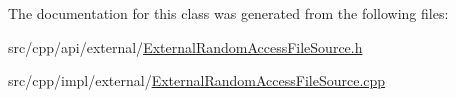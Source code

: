 The documentation for this class was generated from the following files:\begin{DoxyCompactItemize}
\item 
src/cpp/api/external/\hyperlink{ExternalRandomAccessFileSource_8h}{ExternalRandomAccessFileSource.h}\item 
src/cpp/impl/external/\hyperlink{ExternalRandomAccessFileSource_8cpp}{ExternalRandomAccessFileSource.cpp}\end{DoxyCompactItemize}
